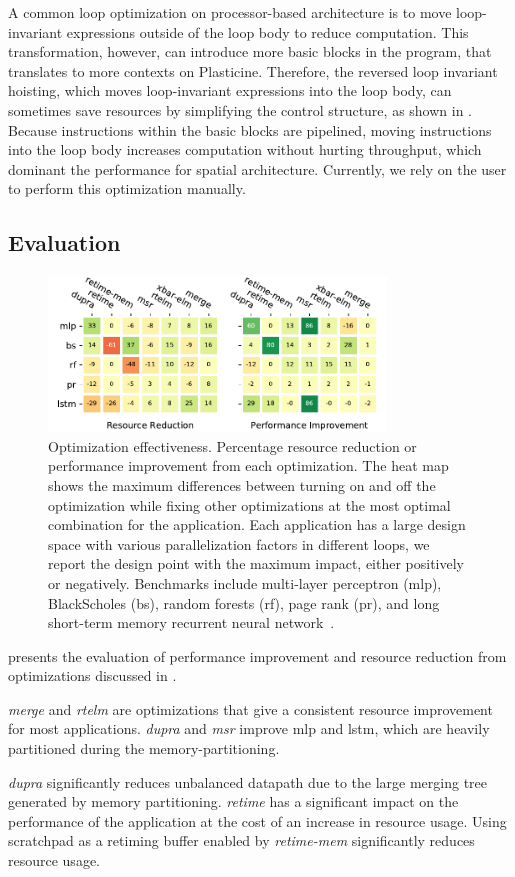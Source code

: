 A common loop optimization on processor-based architecture is to move loop-invariant expressions 
outside of the loop body to reduce computation. 
This transformation, however, can introduce more basic blocks in the program, that translates to
more contexts on Plasticine.
Therefore, the reversed loop invariant hoisting, which moves loop-invariant expressions into the loop body, can sometimes save resources by simplifying the control structure, as shown in 
.
Because instructions within the basic blocks are pipelined, 
moving instructions into the loop body increases computation without hurting throughput, which
dominant the performance for spatial architecture.
Currently, we rely on the user to perform this optimization manually.

\subsection{Evaluation}

\begin{figure}
\centering
\includegraphics[width=0.8\textwidth]{figs/heat.pdf}
\caption[Optimization effectiveness]{
  Optimization effectiveness. Percentage resource reduction or performance improvement from each optimization. 
The heat map shows the maximum differences between turning on and off the optimization 
  while fixing other optimizations at the most optimal combination for the application.
  Each application has a large design space with various parallelization factors in different loops, 
  we report the design point with the maximum impact, either positively or negatively.
  Benchmarks include multi-layer perceptron (mlp), BlackScholes (bs), random forests (rf), page rank
  (pr), and long short-term memory recurrent neural network~\cite{hochreiter1997long}.
}
\label{fig:heat}
\end{figure}

 presents the evaluation of performance improvement and resource reduction from
optimizations discussed in .

\emph{merge} and \emph{rtelm} are optimizations that give a consistent resource improvement for most applications.
\emph{dupra} and \emph{msr} improve mlp and lstm, which are heavily partitioned during the memory-partitioning.

\emph{dupra} significantly reduces unbalanced datapath due to the large merging tree generated by memory partitioning.
\emph{retime} has a significant impact on the performance of the application at the cost of an increase in resource usage.
Using scratchpad as a retiming buffer enabled by \emph{retime-mem} significantly reduces resource usage.

